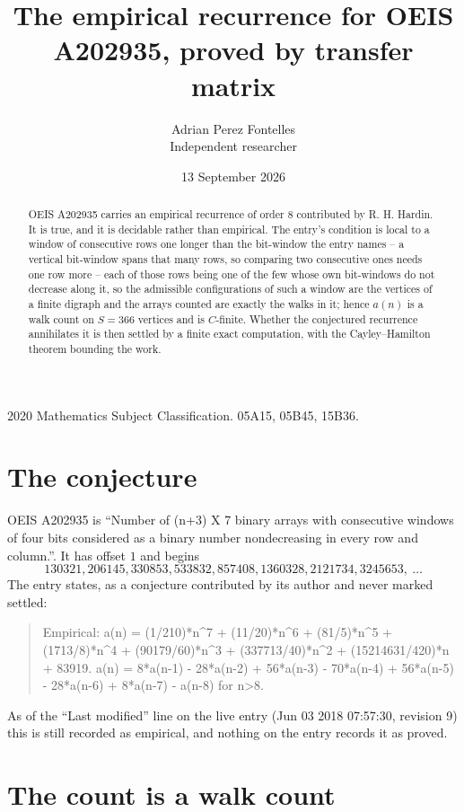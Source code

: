 \documentclass[11pt,a4paper]{article}
\title{The empirical recurrence for OEIS A202935, proved by transfer matrix}
\author{Adrian Perez Fontelles\\ \small Independent researcher}
\date{13 September 2026}
\theoremstyle{plain}
\theoremstyle{definition}
\begin{document}
\maketitle

\begin{abstract}
OEIS A202935 carries an empirical recurrence of order $8$ contributed by R. H. Hardin. It is
true, and it is decidable rather than empirical. The entry's condition is local to a window of consecutive rows one longer than the bit-window the entry names -- a vertical bit-window spans that many rows, so comparing two consecutive ones needs one row more -- each of those rows being one of the few whose own bit-windows do not decrease along it, so
the admissible configurations of such a window are the vertices of a finite digraph and the
arrays counted are exactly the walks in it; hence $a(n)$ is a walk count on $S=366$ vertices
and is $C$-finite. Whether the conjectured recurrence annihilates it is then settled by a
finite exact computation, with the Cayley--Hamilton theorem bounding the work.
\end{abstract}

\noindent\small 2020 Mathematics Subject Classification. 05A15, 05B45, 15B36.\normalsize

\section{The conjecture}

OEIS A202935 is ``Number of (n+3) X 7 binary arrays with consecutive windows of four bits considered as a binary number nondecreasing in every row and column.''. It has offset $1$ and begins
\[
130321, 206145, 330853, 533832, 857408, 1360328, 2121734, 3245653,\ \dots
\]
The entry states, as a conjecture contributed by its author and never marked settled:
\begin{quote}
Empirical: a(n) = (1/210)*n\^{}7 + (11/20)*n\^{}6 + (81/5)*n\^{}5 + (1713/8)*n\^{}4 + (90179/60)*n\^{}3 + (337713/40)*n\^{}2 + (15214631/420)*n + 83919. a(n) = 8*a(n-1) - 28*a(n-2) + 56*a(n-3) - 70*a(n-4) + 56*a(n-5) - 28*a(n-6) + 8*a(n-7) - a(n-8) for n>8.
\end{quote}
As of the ``Last modified'' line on the live entry (Jun 03 2018 07:57:30, revision 9) this is still
recorded as empirical, and nothing on the entry records it as proved.

\section{The count is a walk count}
\end{document}
